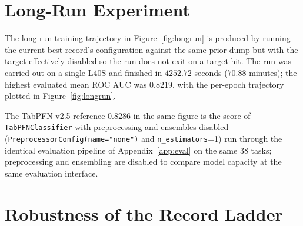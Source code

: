 \documentclass{article}
\theoremstyle{plain}
\theoremstyle{definition}
\theoremstyle{remark}
\begin{document}
\section{Long-Run Experiment}
\label{app:longrun}
The long-run training trajectory in Figure~\ref{fig:longrun} is produced by running the current best record's configuration against the same prior dump but with the target effectively disabled so the run does not exit on a target hit.
The run was carried out on a single L40S and finished in $4252.72$ seconds ($70.88$ minutes); the highest evaluated mean ROC AUC was $0.8219$, with the per-epoch trajectory plotted in Figure~\ref{fig:longrun}.

The TabPFN v2.5 reference $0.8286$ in the same figure is the score of \texttt{TabPFNClassifier} with preprocessing and ensembles disabled (\texttt{PreprocessorConfig(name="none")} and \texttt{n\_estimators}{=}1) run through the identical evaluation pipeline of Appendix~\ref{app:eval} on the same 38 tasks; preprocessing and ensembling are disabled to compare model capacity at the same evaluation interface.

\section{Robustness of the Record Ladder}
\label{app:robustness}
\end{document}
